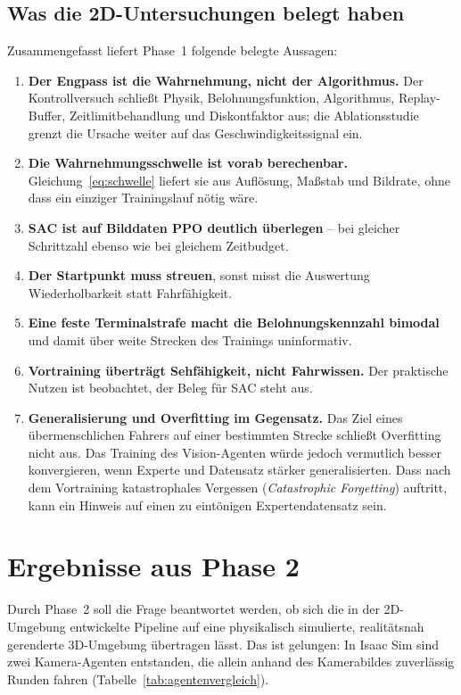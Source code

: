 \subsection*{Was die 2D-Untersuchungen belegt haben}

Zusammengefasst liefert Phase~1 folgende belegte Aussagen:

\begin{enumerate}
  \item \textbf{Der Engpass ist die Wahrnehmung, nicht der Algorithmus.} Der Kontrollversuch schließt Physik, Belohnungsfunktion, Algorithmus, Replay-Buffer, Zeitlimitbehandlung und Diskontfaktor aus; die Ablationsstudie grenzt die Ursache weiter auf das Geschwindigkeitssignal ein.
  \item \textbf{Die Wahrnehmungsschwelle ist vorab berechenbar.} Gleichung~\eqref{eq:schwelle} liefert sie aus Auflösung, Maßstab und Bildrate, ohne dass ein einziger Trainingslauf nötig wäre.
  \item \textbf{\ac{SAC} ist auf Bilddaten \ac{PPO} deutlich überlegen} -- bei gleicher Schrittzahl ebenso wie bei gleichem Zeitbudget.
  \item \textbf{Der Startpunkt muss streuen}, sonst misst die Auswertung Wiederholbarkeit statt Fahrfähigkeit.
  \item \textbf{Eine feste Terminalstrafe macht die Belohnungskennzahl bimodal} und damit über weite Strecken des Trainings uninformativ.
  \item \textbf{Vortraining überträgt Sehfähigkeit, nicht Fahrwissen.} Der praktische Nutzen ist beobachtet, der Beleg für \ac{SAC} steht aus.
  \item \textbf{Generalisierung und Overfitting im Gegensatz.} Das Ziel eines übermenschlichen Fahrers auf einer bestimmten Strecke schließt Overfitting nicht aus. Das Training des Vision-Agenten würde jedoch vermutlich besser konvergieren, wenn Experte und Datensatz stärker generalisierten. Dass nach dem Vortraining katastrophales Vergessen (\emph{Catastrophic Forgetting}) auftritt, kann ein Hinweis auf einen zu eintönigen Expertendatensatz sein.
\end{enumerate}

\section{Ergebnisse aus Phase 2}
\label{sec:ergebnisse_phase2}

Durch Phase~2 soll die Frage beantwortet werden, ob sich die in der 2D-Umgebung entwickelte Pipeline auf eine physikalisch simulierte, realitätsnah gerenderte 3D-Umgebung übertragen lässt. Das ist gelungen: In Isaac Sim sind zwei Kamera-Agenten entstanden, die allein anhand des Kamerabildes zuverlässig Runden fahren (Tabelle~\ref{tab:agentenvergleich}).

